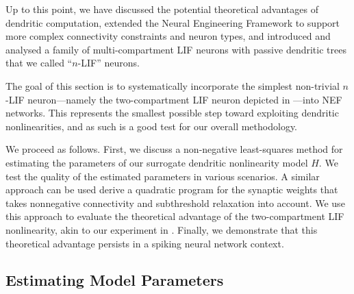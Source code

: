 Up to this point, we have discussed the potential theoretical advantages of dendritic computation, extended the Neural Engineering Framework to support more complex connectivity constraints and neuron types, and introduced and analysed a family of multi-compartment LIF neurons with passive dendritic trees that we called \enquote{$n$-LIF} neurons.

The goal of this section is to systematically incorporate the simplest non-trivial $n$-LIF neuron---namely the two-compartment LIF neuron depicted in ---into NEF networks.
This represents the smallest possible step toward exploiting dendritic nonlinearities, and as such is a good test for our overall methodology.

We proceed as follows.
First, we discuss a non-negative least-squares method for estimating the parameters of our surrogate dendritic nonlinearity model $H$.
We test the quality of the estimated parameters in various scenarios.
A similar approach can be used derive a quadratic program for the synaptic weights that takes nonnegative connectivity and subthreshold relaxation into account.
We use this approach to evaluate the theoretical advantage of the two-compartment LIF nonlinearity, akin to our experiment in .
Finally, we demonstrate that this theoretical advantage persists in a spiking neural network context.




\subsection{Estimating Model Parameters}
\label{sec:two_comp_lif_fit_model}

